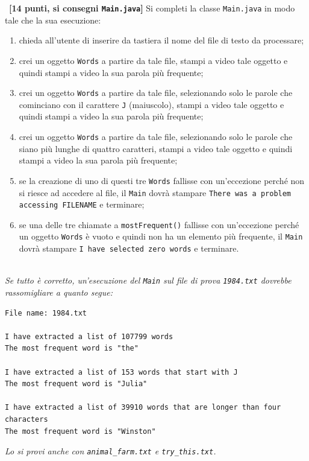 \documentclass[12pt]{article}
\newcounter{esnu}
\newenvironment{esercizio}{\medskip \noindent {\bf Esercizio\addtocounter{esnu}{1} \arabic{esnu}}}{}
\begin{document}
\begin{esercizio}~\textbf{[14 punti, si consegni \texttt{Main.java}]}
  Si completi la classe \texttt{Main.java} in modo tale che la sua esecuzione:
  \begin{enumerate}
  \item chieda all'utente di inserire da tastiera il nome del file di testo da
    processare;
  \item crei un oggetto \texttt{Words} a partire da tale file, stampi a video
    tale oggetto e quindi stampi a video la sua parola pi\`u frequente;
  \item crei un oggetto \texttt{Words} a partire da tale file, selezionando solo le
    parole che cominciano con il carattere \texttt{J} (maiuscolo), stampi
    a video tale oggetto e quindi stampi a video la sua parola pi\`u frequente;
  \item crei un oggetto \texttt{Words} a partire da tale file, selezionando solo le
    parole che siano pi\`u lunghe di quattro caratteri, stampi
    a video tale oggetto e quindi stampi a video la sua parola pi\`u frequente;
  \item se la creazione di uno di questi tre \texttt{Words} fallisse
    con un'eccezione
    perch\'e non si riesce ad accedere al file, il \texttt{Main}
    dovr\`a stampare \texttt{There was a problem accessing FILENAME}
    e terminare;
  \item se una delle tre chiamate a \texttt{mostFrequent()} fallisse
    con un'eccezione perch\'e un oggetto \texttt{Words} \`e vuoto e quindi
    non ha un elemento pi\`u frequente, il \texttt{Main} dovr\`a
    stampare \texttt{I have selected zero words} e terminare.
  \end{enumerate}
\end{esercizio}

\mbox{}\\

\emph{Se tutto \`e  corretto, un'esecuzione del \texttt{Main}
  sul file di prova \texttt{1984.txt} dovrebbe rassomigliare a quanto segue:}
\begin{verbatim}
File name: 1984.txt

I have extracted a list of 107799 words
The most frequent word is "the"

I have extracted a list of 153 words that start with J
The most frequent word is "Julia"

I have extracted a list of 39910 words that are longer than four characters
The most frequent word is "Winston"
\end{verbatim}

\emph{Lo si provi anche con \texttt{animal\_farm.txt} e \texttt{try\_this.txt}.}
\end{document}
